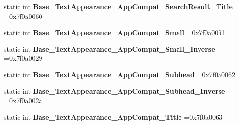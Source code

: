 \begin{DoxyCompactItemize}
\mbox{\label{classandroid_1_1support_1_1graphics_1_1drawable_1_1animated_1_1R_1_1style_a7497ebb2b92ecc95d25d38828ee1bf0c}} 
static int {\bfseries Base\+\_\+\+Text\+Appearance\+\_\+\+App\+Compat\+\_\+\+Search\+Result\+\_\+\+Title} =0x7f0a0060
\item 
\mbox{\label{classandroid_1_1support_1_1graphics_1_1drawable_1_1animated_1_1R_1_1style_ad7ebac96fec99d481a0098c37b576337}} 
static int {\bfseries Base\+\_\+\+Text\+Appearance\+\_\+\+App\+Compat\+\_\+\+Small} =0x7f0a0061
\item 
\mbox{\label{classandroid_1_1support_1_1graphics_1_1drawable_1_1animated_1_1R_1_1style_a23b8360b9676b7e87a9285c4f0110111}} 
static int {\bfseries Base\+\_\+\+Text\+Appearance\+\_\+\+App\+Compat\+\_\+\+Small\+\_\+\+Inverse} =0x7f0a0029
\item 
\mbox{\label{classandroid_1_1support_1_1graphics_1_1drawable_1_1animated_1_1R_1_1style_a8a2b637bd815a73cf8a1ab60fa8e41aa}} 
static int {\bfseries Base\+\_\+\+Text\+Appearance\+\_\+\+App\+Compat\+\_\+\+Subhead} =0x7f0a0062
\item 
\mbox{\label{classandroid_1_1support_1_1graphics_1_1drawable_1_1animated_1_1R_1_1style_aa6f29758f7c59ca1afc0b9c3ac2bda81}} 
static int {\bfseries Base\+\_\+\+Text\+Appearance\+\_\+\+App\+Compat\+\_\+\+Subhead\+\_\+\+Inverse} =0x7f0a002a
\item 
\mbox{\label{classandroid_1_1support_1_1graphics_1_1drawable_1_1animated_1_1R_1_1style_ad63fdd338fe04e0e0f0b7f0fc501d4f3}} 
static int {\bfseries Base\+\_\+\+Text\+Appearance\+\_\+\+App\+Compat\+\_\+\+Title} =0x7f0a0063
\item 
\mbox{\label{classandroid_1_1support_1_1graphics_1_1drawable_1_1animated_1_1R_1_1style_aada91057295458f40895e9c51ef0b207}} 

\end{DoxyCompactItemize}
